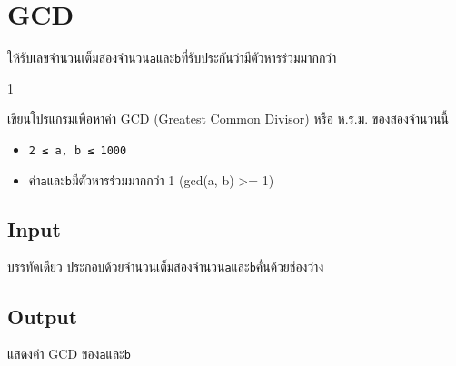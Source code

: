 \documentclass{article}
\begin{document}
\section*{GCD}

ให้รับเลขจำนวนเต็มสองจำนวน\texttt{a}และ\texttt{b}ที่รับประกันว่ามีตัวหารร่วมมากกว่า

1



เขียนโปรแกรมเพื่อหาค่า GCD (Greatest Common Divisor) หรือ ห.ร.ม. ของสองจำนวนนี้



\begin{itemize}

\item

  \texttt{2\ ≤\ a,\ b\ ≤\ 1000}

\item

  ค่า\texttt{a}และ\texttt{b}มีตัวหารร่วมมากกว่า 1 (gcd(a, b) \textgreater= 1)

\end{itemize}



\subsection*{Input}
บรรทัดเดียว ประกอบด้วยจำนวนเต็มสองจำนวน\texttt{a}และ\texttt{b}คั่นด้วยช่องว่าง\\



\subsection*{Output}
แสดงค่า GCD ของ\texttt{a}และ\texttt{b}\\
\end{document}
